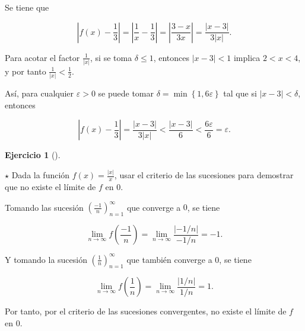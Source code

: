 \documentclass[
  spanish,
  a4paper,
]{scrreport}
\theoremstyle{definition}
\newtheorem{exercise}{Ejercicio}[chapter]
\theoremstyle{remark}
\begin{document}
\begin{tcolorbox}[enhanced jigsaw, arc=.35mm, bottomrule=.15mm, bottomtitle=1mm, breakable, colback=white, colbacktitle=quarto-callout-tip-color!10!white, colframe=quarto-callout-tip-color-frame, coltitle=black, left=2mm, leftrule=.75mm, opacityback=0, opacitybacktitle=0.6, rightrule=.15mm, title=\textcolor{quarto-callout-tip-color}{\faLightbulb}\hspace{0.5em}{Solución}, titlerule=0mm, toprule=.15mm, toptitle=1mm]

Se tiene que

\[
\left|f(x)-\frac{1}{3}\right| = \left|\frac{1}{x}-\frac{1}{3}\right| = \left|\frac{3-x}{3x}\right| = \frac{|x-3|}{3|x|}.
\]

Para acotar el factor \(\frac{1}{|x|}\), si se toma \(\delta\leq 1\),
entonces \(|x-3|<1\) implica \(2<x<4\), y por tanto
\(\frac{1}{|x|}<\frac{1}{2}\).

Así, para cualquier \(\varepsilon>0\) se puede tomar
\(\delta = \min\left\{1,6\varepsilon\right\}\) tal que si
\(|x-3|<\delta\), entonces

\[
\left|f(x)-\frac{1}{3}\right| = \frac{|x-3|}{3|x|} < \frac{|x-3|}{6} < \frac{6\varepsilon}{6} = \varepsilon.
\]

\end{tcolorbox}

\begin{exercise}[]\protect\hypertarget{exr-limite-criterio-sucesiones}{}\label{exr-limite-criterio-sucesiones}

\(\star\) Dada la función \(f(x)=\frac{|x|}{x}\), usar el criterio de
las sucesiones para demostrar que no existe el límite de \(f\) en \(0\).

\end{exercise}

\begin{tcolorbox}[enhanced jigsaw, arc=.35mm, bottomrule=.15mm, bottomtitle=1mm, breakable, colback=white, colbacktitle=quarto-callout-tip-color!10!white, colframe=quarto-callout-tip-color-frame, coltitle=black, left=2mm, leftrule=.75mm, opacityback=0, opacitybacktitle=0.6, rightrule=.15mm, title=\textcolor{quarto-callout-tip-color}{\faLightbulb}\hspace{0.5em}{Solución}, titlerule=0mm, toprule=.15mm, toptitle=1mm]

Tomando las sucesión \(\left(\frac{-1}{n}\right)_{n=1}^\infty\) que
converge a \(0\), se tiene

\[
\lim_{n\to\infty}f\left(\frac{-1}{n}\right)=\lim_{n\to\infty}\frac{|-1/n|}{-1/n} = -1.
\]

Y tomando la sucesión \(\left(\frac{1}{n}\right)_{n=1}^\infty\) que
también converge a \(0\), se tiene

\[
\lim_{n\to\infty}f\left(\frac{1}{n}\right)=\lim_{n\to\infty}\frac{|1/n|}{1/n} = 1.
\]

Por tanto, por el criterio de las sucesiones convergentes, no existe el
límite de \(f\) en \(0\).

\end{tcolorbox}
\end{document}
